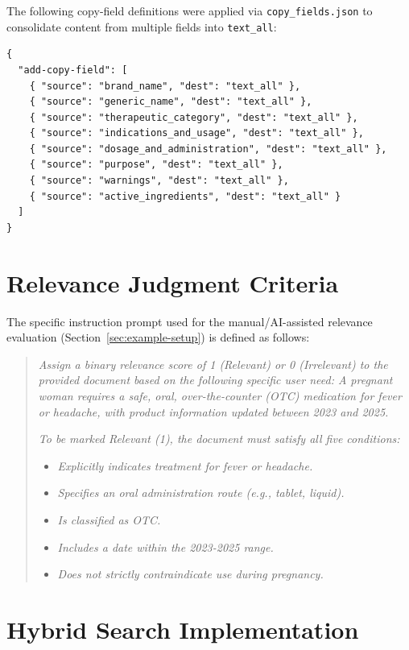 The following copy-field definitions were applied via \texttt{copy\_fields.json} to consolidate content from multiple fields into \texttt{text\_all}:

\begin{verbatim}
{
  "add-copy-field": [
    { "source": "brand_name", "dest": "text_all" },
    { "source": "generic_name", "dest": "text_all" },
    { "source": "therapeutic_category", "dest": "text_all" },
    { "source": "indications_and_usage", "dest": "text_all" },
    { "source": "dosage_and_administration", "dest": "text_all" },
    { "source": "purpose", "dest": "text_all" },
    { "source": "warnings", "dest": "text_all" },
    { "source": "active_ingredients", "dest": "text_all" }
  ]
}
\end{verbatim}
\section{Relevance Judgment Criteria}
\label{appendix:relevance-criteria}

The specific instruction prompt used for the manual/AI-assisted relevance evaluation (Section~\ref{sec:example-setup}) is defined as follows:

\begin{quote}
  \textit{Assign a binary relevance score of 1 (Relevant) or 0 (Irrelevant) to the provided document based on the following specific user need: A pregnant woman requires a safe, oral, over-the-counter (OTC) medication for fever or headache, with product information updated between 2023 and 2025.}

  \textit{To be marked Relevant (1), the document must satisfy all five conditions:}
  \begin{itemize}
    \item \textit{Explicitly indicates treatment for fever or headache.}
    \item \textit{Specifies an oral administration route (e.g., tablet, liquid).}
    \item \textit{Is classified as OTC.}
    \item \textit{Includes a date within the 2023-2025 range.}
    \item \textit{Does not strictly contraindicate use during pregnancy.}
  \end{itemize}
\end{quote}

\section{Hybrid Search Implementation}
\label{appendix:hybrid-code}

